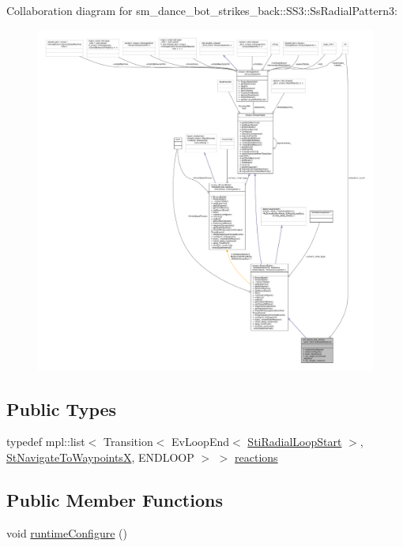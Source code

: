 Collaboration diagram for sm\+\_\+dance\+\_\+bot\+\_\+strikes\+\_\+back\+:\+:S\+S3\+:\+:Ss\+Radial\+Pattern3\+:
\nopagebreak
\begin{figure}[H]
\begin{center}
\leavevmode
\includegraphics[width=350pt]{structsm__dance__bot__strikes__back_1_1SS3_1_1SsRadialPattern3__coll__graph}
\end{center}
\end{figure}
\subsection*{Public Types}
\begin{DoxyCompactItemize}
\item 
typedef mpl\+::list$<$ Transition$<$ Ev\+Loop\+End$<$ \hyperlink{structsm__dance__bot__strikes__back_1_1radial__motion__states_1_1StiRadialLoopStart}{Sti\+Radial\+Loop\+Start} $>$, \hyperlink{structsm__dance__bot__strikes__back_1_1StNavigateToWaypointsX}{St\+Navigate\+To\+WaypointsX}, E\+N\+D\+L\+O\+OP $>$ $>$ \hyperlink{structsm__dance__bot__strikes__back_1_1SS3_1_1SsRadialPattern3_ac7bfc9daf522cdf03a39556fd9c43b7a}{reactions}
\end{DoxyCompactItemize}
\subsection*{Public Member Functions}
\begin{DoxyCompactItemize}
\item 
void \hyperlink{structsm__dance__bot__strikes__back_1_1SS3_1_1SsRadialPattern3_a11c942aec9ce2713e2fbaf02095307ac}{runtime\+Configure} ()
\end{DoxyCompactItemize}
